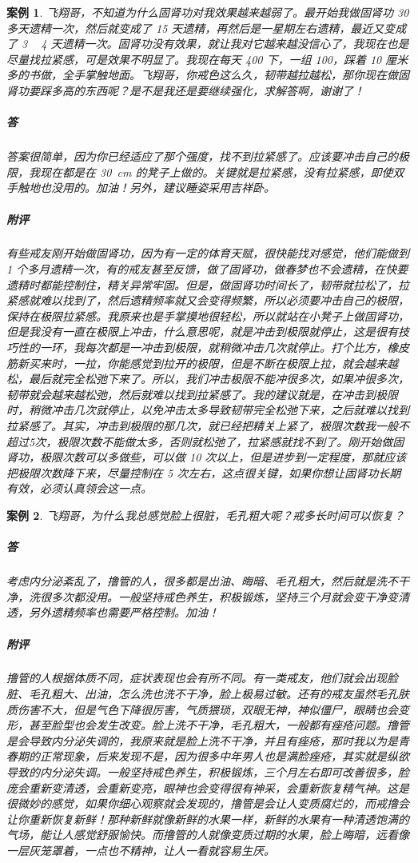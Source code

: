 \documentclass[fontset=founder]{ctexart}
\newtheorem{case}{案例}
\begin{document}
\begin{case}
    飞翔哥，不知道为什么固肾功对我效果越来越弱了。最开始我做固肾功 30 多天遗精一次，然后就变成了 15 天遗精，再然后是一星期左右遗精，最近又变成了 3 ~ 4 天遗精一次。固肾功没有效果，就让我对它越来越没信心了，我现在也是尽量找拉紧感，可是效果不明显了。我现在每天 400 下，一组 100，踩着 10 厘米多的书做，全手掌触地面。飞翔哥，你戒色这么久，韧带越拉越松，那你现在做固肾功要踩多高的东西呢？是不是我还是要继续强化，求解答啊，谢谢了！
    \subparagraph{答} 答案很简单，因为你已经适应了那个强度，找不到拉紧感了。应该要冲击自己的极限，我现在都是在 \SI{30}{\centi\metre} 的凳子上做的。关键就是拉紧感，没有拉紧感，即使双手触地也没用的。加油！另外，建议睡姿采用吉祥卧。
    \subparagraph{附评} 有些戒友刚开始做固肾功，因为有一定的体育天赋，很快能找对感觉，他们能做到 1 个多月遗精一次，有的戒友甚至反馈，做了固肾功，做春梦也不会遗精，在快要遗精时都能控制住，精关异常牢固。但是，做固肾功时间长了，韧带就拉松了，拉紧感就难以找到了，然后遗精频率就又会变得频繁，所以必须要冲击自己的极限，保持在极限拉紧感。我原来也是手掌摸地很轻松，所以就站在小凳子上做固肾功，但是我没有一直在极限上冲击，什么意思呢，就是冲击到极限就停止，这是很有技巧性的一环，我每次都是一冲击到极限，就稍微冲击几次就停止。打个比方，橡皮筋新买来时，一拉，你能感觉到拉开的极限，但是不断在极限上拉，就会越来越松，最后就完全松弛下来了。所以，我们冲击极限不能冲很多次，如果冲很多次，韧带就会越来越松弛，然后就难以找到拉紧感了。我的建议就是，在冲击到极限时，稍微冲击几次就停止，以免冲击太多导致韧带完全松弛下来，之后就难以找到拉紧感了。其实，冲击到极限的那几次，就已经把精关上紧了，极限次数我一般不超过5次，极限次数不能做太多，否则就松弛了，拉紧感就找不到了。刚开始做固肾功，极限次数可以多做些，可以做 10 次以上，但是进步到一定程度，那就应该把极限次数降下来，尽量控制在 5 次左右，这点很关键，如果你想让固肾功长期有效，必须认真领会这一点。
\end{case}

\begin{case}
    飞翔哥，为什么我总感觉脸上很脏，毛孔粗大呢？戒多长时间可以恢复？
    \subparagraph{答} 考虑内分泌紊乱了，撸管的人，很多都是出油、晦暗、毛孔粗大，然后就是洗不干净，洗很多次都没用。一般坚持戒色养生，积极锻炼，坚持三个月就会变干净变清透，另外遗精频率也需要严格控制。加油！
    \subparagraph{附评} 撸管的人根据体质不同，症状表现也会有所不同。有一类戒友，他们就会出现脸脏、毛孔粗大、出油，怎么洗也洗不干净，脸上极易过敏。还有的戒友虽然毛孔肤质伤害不大，但是气色下降很厉害，气质猥琐，双眼无神，神似僵尸，眼睛也会变形，甚至脸型也会发生改变。脸上洗不干净，毛孔粗大，一般都有痤疮问题。撸管是会导致内分泌失调的，我原来就是脸上洗不干净，并且有痤疮，那时我以为是青春期的正常现象，后来发现不是，因为很多中年男人也是满脸痤疮，其实就是纵欲导致的内分泌失调。一般坚持戒色养生，积极锻炼，三个月左右即可改善很多，脸庞会重新变清透，会重新变亮，眼神也会变得很有神采，会重新恢复精气神。这是很微妙的感觉，如果你细心观察就会发现的，撸管是会让人变质腐烂的，而戒撸会让你重新恢复新鲜！那种新鲜就像新鲜的水果一样，新鲜的水果有一种清透饱满的气场，能让人感觉舒服愉快。而撸管的人就像变质过期的水果，脸上晦暗，远看像一层灰笼罩着，一点也不精神，让人一看就容易生厌。
\end{case}
\end{document}
